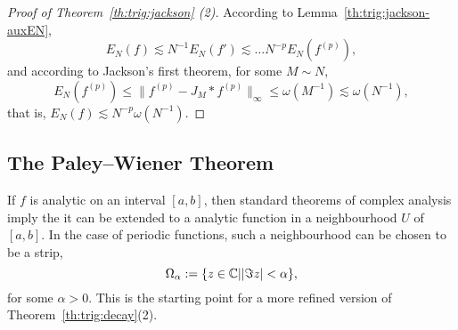 \begin{proof}[Proof of Theorem~\ref{th:trig:jackson} (2)]
  According to Lemma~\ref{th:trig:jackson-auxEN},
  \[
    E_N(f) \lesssim N^{-1} E_N(f') \lesssim \dots
    N^{-p} E_N(f^{(p)}),
  \]
  and according to Jackson's first theorem, for some $M \sim N$,
  \[
    E_N(f^{(p)}) \leq \| f^{(p)} - J_M \ast f^{(p)} \|_\infty
      \leq \omega(M^{-1}) \lesssim \omega(N^{-1}),
  \]
  that is, $E_N(f) \lesssim N^{-p} \omega(N^{-1})$.
\end{proof}





\subsection{The Paley--Wiener Theorem}
%
\label{sec:trip:pw}
%
If $f$ is analytic on an interval $[a, b]$, then standard theorems of complex
analysis imply the it can be extended to a analytic function in a
neighbourhood $U$ of $[a, b]$. In the case of periodic functions, such a
neighbourhood can be chosen to be a strip,
\[
  \Omega_\alpha := \{ z \in \mathbb{C} | |\Im z| < \alpha \},
\]
for some $\alpha > 0$. This is the starting point for a more refined
version of Theorem~\ref{th:trig:decay}(2).

